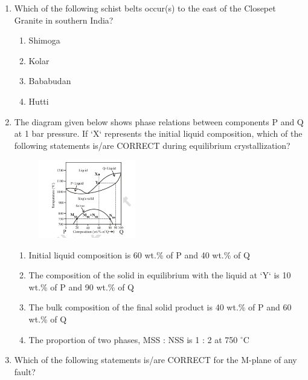 \documentclass[journal,12pt,onecolumn]{IEEEtran}
\begin{document}
\begin{enumerate}
\item Which of the following schist belts occur(s) to the east of the Closepet Granite in southern India?  

\hfill{}

\begin{multicols}{2}
\begin{enumerate}
\item Shimoga
\item Kolar
\item Bababudan
\item Hutti
\end{enumerate}
\end{multicols}

\item The diagram given below shows phase relations between components P and Q at 1 bar pressure. If `X` represents the initial liquid composition, which of the following statements is/are CORRECT during equilibrium crystallization?  

\begin{figure}[h!]
    \centering
    \includegraphics[width=0.4\textwidth]{figs/fig8.png}
    \caption{}
    \label{fig:q18}
\end{figure}


\hfill{}


\begin{enumerate}
\item Initial liquid composition is 60 wt.\% of P and 40 wt.\% of Q
\item The composition of the solid in equilibrium with the liquid at `Y` is 10 wt.\% of P and 90 wt.\% of Q
\item The bulk composition of the final solid product is 40 wt.\% of P and 60 wt.\% of Q
\item The proportion  of two phases, MSS : NSS is 1 : 2 at 750 $^\circ$C
\end{enumerate}


\item Which of the following statements is/are CORRECT for the M-plane of any fault?  


\end{enumerate}
\end{document}
